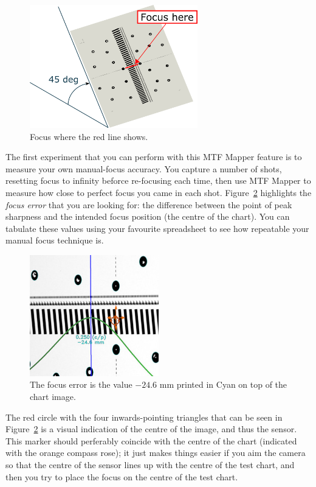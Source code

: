 \documentclass[a4paper]{article}
\begin{document}
\begin{figure}
\centering
\includegraphics[width=0.65\textwidth]{figures/manual_focus_position}
\caption{Focus where the red line shows.}
\label{fig:manual_focus_position}
\end{figure}

The first experiment that you can perform with this MTF Mapper feature is to
measure your own manual-focus accuracy. You capture a number of shots,
resetting focus to infinity beforce re-focusing each time, then use MTF Mapper to measure how
close to perfect focus you came in each shot.
Figure~\ref{fig:manual_focus_reading} highlights the \emph{focus error} that you are
looking for: the difference between the point of peak sharpness and the
intended focus position (the centre of the chart). You can tabulate these
values using your favourite spreadsheet to see how repeatable your manual focus technique is.

\begin{figure}
\centering
\includegraphics[width=0.5\textwidth]{figures/manual_focus_reading}
\caption{The focus error is the value $-24.6$ mm printed in Cyan on top of
the chart image.}
\label{fig:manual_focus_reading}
\end{figure}

The red circle with the four inwards-pointing triangles that can be seen in 
Figure~\ref{fig:manual_focus_reading} is a visual indication of the centre
of the image, and thus the sensor. This marker should  perferably coincide
with the centre of the chart (indicated with the orange compass rose); it
just makes things easier if you aim the camera so that the centre of the
sensor lines up with the centre of the test chart, and then you try to place
the focus on the centre of the test chart.
\end{document}
